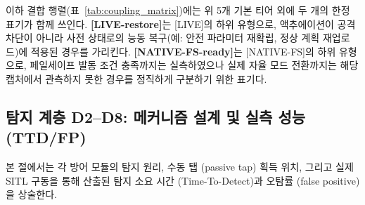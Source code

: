 이하 결합 행렬(표~\ref{tab:coupling_matrix})에는 위 5개 기본 티어 외에 두 개의 한정 표기가 함께 쓰인다. \textbf{[LIVE-restore]}는 [LIVE]의 하위 유형으로, 액추에이션이 공격 차단이 아니라 사전 상태로의 능동 복구(예: 안전 파라미터 재확립, 정상 계획 재업로드)에 적용된 경우를 가리킨다. \textbf{[NATIVE-FS-ready]}는 [NATIVE-FS]의 하위 유형으로, 페일세이프 발동 조건 충족까지는 실측하였으나 실제 자율 모드 전환까지는 해당 캡처에서 관측하지 못한 경우를 정직하게 구분하기 위한 표기다.

\subsection{탐지 계층 D2--D8: 메커니즘 설계 및 실측 성능 (TTD/FP)}

본 절에서는 각 방어 모듈의 탐지 원리, 수동 탭 (passive tap) 획득 위치, 그리고 실제 SITL 구동을 통해 산출된 탐지 소요 시간 (Time-To-Detect)과 오탐률 (false positive)을 상술한다.

